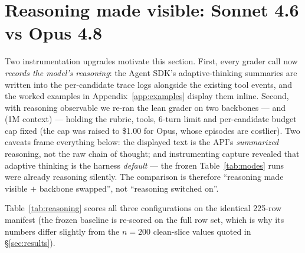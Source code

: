 \documentclass[11pt,letterpaper]{article}
\begin{document}
\section{Reasoning made visible: Sonnet 4.6 vs Opus 4.8}
\label{sec:reasoning}

Two instrumentation upgrades motivate this section. First, every grader call now
\emph{records the model's reasoning}: the Agent SDK's adaptive-thinking summaries are
written into the per-candidate trace logs alongside the existing tool events, and the
worked examples in Appendix~\ref{app:examples} display them inline. Second, with
reasoning observable we re-ran the lean grader on two backbones ---
 and  (1M context) --- holding the
rubric, tools, 6-turn limit and per-candidate budget cap fixed (the cap was raised
to \$1.00 for Opus, whose episodes are costlier). Two caveats frame everything
below: the displayed text is the API's \emph{summarized} reasoning, not the raw
chain of thought; and instrumenting capture revealed that adaptive thinking is the
harness \emph{default} --- the frozen Table~\ref{tab:modes} runs were already
reasoning silently. The comparison is therefore ``reasoning made visible $+$
backbone swapped'', not ``reasoning switched on''.

Table~\ref{tab:reasoning} scores all three configurations on the identical 225-row
manifest (the frozen baseline is re-scored on the full row set, which is why its
numbers differ slightly from the $n{=}200$ clean-slice values quoted in
\S\ref{sec:results}).
\end{document}
